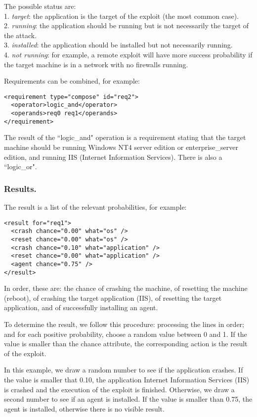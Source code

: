 \documentclass{llncs}
\begin{document}
The possible status are: \\
1. \emph{target}: the application is the target of the exploit (the most common  case). \\
2. \emph{running}: the application should be running but is not necessarily the  target of the attack. \\
3. \emph{installed}: the application should be installed but not necessarily  running. \\
4. \emph{not running}: for  example, a remote exploit will have more success probability if the target  machine is in a network 
with no firewalls running.

Requirements can be combined, for example:
\begin{verbatim}
<requirement type="compose" id="req2">
  <operator>logic_and</operator> 
  <operands>req0 req1</operands> 
</requirement>
\end{verbatim}
The result of the ``logic\_and" operation is a requirement stating that the  target machine should be running 
Windows NT4 server edition or  enterprise\_server edition, and running IIS (Internet Information Services). 
 There is also a ``logic\_or".

 
\subsubsection{Results.}

The result is a list of the relevant probabilities, for example:
\begin{verbatim}
<result for="req1">
  <crash chance="0.00" what="os" /> 
  <reset chance="0.00" what="os" /> 
  <crash chance="0.10" what="application" /> 
  <reset chance="0.00" what="application" /> 
  <agent chance="0.75" /> 
</result>
\end{verbatim}

In order, these are: the chance of crashing the machine, 
of resetting the  machine (reboot), 
of crashing the target application (IIS), 
of resetting the  target application, and of successfully installing an agent.

To determine the result, we follow this procedure: 
processing the lines in  order; and for each positive probability, 
choose a random value between 0 and 1.  If the value is smaller than the chance attribute, 
the corresponding action is  the result of the exploit. 

In this example, we draw a random number to see if the application crashes. 
If  the value is smaller that 0.10, the application Internet Information Services (IIS) is crashed 
and the  execution of the exploit is finished. 
Otherwise, we draw a second number to  see if an agent is installed. 
If the value is smaller than 0.75, the agent is  installed, otherwise there is no visible result.
\end{document}

